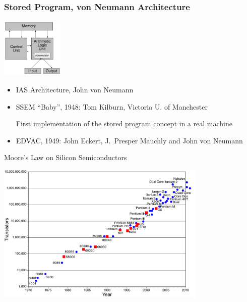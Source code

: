 \documentclass[xcolor=dvipsnames,9pt,mathserif]{beamer}
\renewcommand{\emph}[1]{\alert{#1}}
\begin{document}
\begin{frame}[t]
  \frametitle{Stored Program, von Neumann Architecture}
  \begin{center}
    \includegraphics[width=3cm]{von_neumann_architecture.png}
  \end{center}

  \begin{block}{}
    \begin{itemize}
    \item IAS Architecture, John von Neumann
    \item SSEM ``Baby'', 1948: Tom Kilburn, Victoria U. of Manchester

      First implementation of the \emph{stored program} concept in a
      real machine
    \item EDVAC, 1949: John Eckert, J.\ Presper Mauchly and John von Neumann
    \end{itemize}
  \end{block}
\end{frame}

\begin{frame}{Moore's Law on Silicon Semiconductors}
  \centerline{\includegraphics[width=10cm]{Moores_Law.jpg}}
\end{frame}
\end{document}
